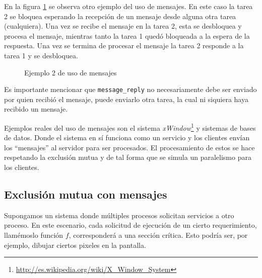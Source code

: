 En la figura \ref{fig:mensajes_ejemplo_2} se observa otro ejemplo del uso de
mensajes. En este caso la tarea 2 se bloquea esperando la recepción de un
mensaje desde alguna otra tarea (cualquiera). Una vez se recibe el mensaje en la
tarea 2, esta se desbloquea y procesa el mensaje, mientras tanto la tarea 1
quedó bloqueada a la espera de la respuesta. Una vez se termina de procesar el
mensaje la tarea 2 responde a la tarea 1 y se desbloquea.

\begin{figure}[htbp]
  \centering
  \caption{Ejemplo 2 de uso de mensajes}
  \label{fig:mensajes_ejemplo_2}
\end{figure}

Es importante mencionar que \texttt{message\_reply} no necesariamente debe ser
enviado por quien recibió el mensaje, puede enviarlo otra tarea, la cual ni
siquiera haya recibido un mensaje.

Ejemplos reales del uso de mensajes son el sistema
\emph{xWindow}\footnote{\url{http://es.wikipedia.org/wiki/X_Window_System}} y
sistemas de bases de datos. Donde el sistema en sí funciona como un servicio y
los clientes envían los ``mensajes'' al servidor para ser procesados. El
procesamiento de estos se hace respetando la exclusión mutua y de tal forma que
se simula un paralelismo para los clientes.

\subsection{Exclusión mutua con mensajes}
Supongamos un sistema donde múltiples procesos solicitan servicios a otro
proceso. En este escenario, cada solicitud de ejecución de un cierto
requerimiento, llamémoslo función $f$, corresponderá a una sección crítica. Esto
podría ser, por ejemplo, dibujar ciertos pixeles en la pantalla.

